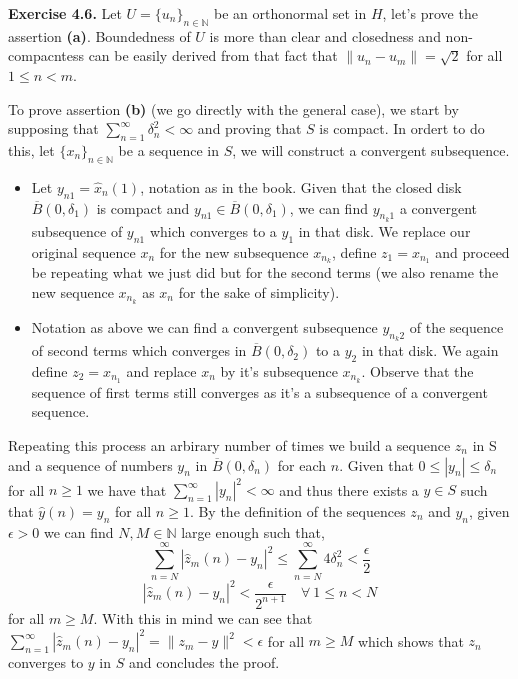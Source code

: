 \documentclass{article}
\begin{document}
\begin{exercise}\textbf{Exercise 4.6.}
    Let $U = \{u_n\}_{n \in \mathbb{N}}$ be an orthonormal set in $H$, let's prove the assertion \textbf{(a)}. Boundedness of $U$ is more than clear and closedness and non-compacntess can be easily derived from that fact that $\|u_n - u_m\| = \sqrt{2}$ for all $1 \le  n < m$. 

\bigbreak

To prove assertion \textbf{(b)} (we go directly with the general case), we start by supposing that $\sum_{n=1}^{\infty} \delta_n^2 < \infty$ and proving that $S$ is compact. In ordert to do this, let $\{x_n\}_{n \in \mathbb{N}}$ be a sequence in $S$, we will construct a convergent subsequence.
\begin{itemize}
    \item Let $y_{n1} = \hat{x}_n \left( 1 \right)$, notation as in the book. Given that the closed disk $\overline{B} \left( 0,\delta_1 \right)$ is compact and $y_{n1} \in \overline{B} \left( 0, \delta_1 \right) $, we can find $y_{n_k1}$ a convergent subsequence of $y_{n1}$ which converges to a $y_1$ in that disk. We replace our original sequence $x_n$ for the new subsequence $x_{n_k}$, define $z_1 = x_{n_1}$  and proceed be repeating what we just did but for the second terms (we also rename the new sequence $x_{n_k}$ as $x_n$ for the sake of simplicity).
    \item Notation as above we can find a convergent subsequence $y_{n_k2}$ of the sequence of second terms which converges in $\overline{B} \left( 0,\delta_2 \right) $ to a $y_2$ in that disk. We again define $z_2 = x_{n_1}$ and replace $x_n$ by it's subsequence $x_{n_k}$. Observe that the sequence of first terms still converges as it's a subsequence of a convergent sequence.  
\end{itemize}
Repeating this process an arbirary number of times we build a sequence $z_n$ in S and a sequence of numbers $y_n$ in $\overline{B} \left( 0,\delta_n \right) $ for each $n$. Given that $0 \le |y_n| \le \delta_n$ for all $n \ge 1$ we have that $\sum_{n=1}^{\infty} |y_n|^2 < \infty $ and thus there exists a $y \in S$ such that $\hat{y} \left( n \right) = y_n$ for all $n \ge 1$. By the definition of the sequences $z_n$ and $y_n$, given $\epsilon > 0$ we can find $N, M \in \mathbb{N}$ large enough such that,
\begin{equation}
    \sum_{n=N}^{\infty} |\hat{z}_m \left( n \right)  - y_n|^2 \le \sum_{n=N}^{\infty} 4\delta_n^2   < \frac{\epsilon}{2}
\end{equation}
\begin{equation}
    |\hat{z}_m \left( n \right)  - y_n|^2 < \frac{\epsilon}{2^{n+1}} \quad \forall\ 1 \le n < N
\end{equation}
for all $m \ge M$. With this in mind we can see that $\sum_{n=1}^{\infty} |\hat{z}_m \left( n \right) - y_n|^2 =  \|z_m-y\|^2 < \epsilon$ for all $m \ge M$ which shows that $z_n$ converges to $y$ in $S$ and concludes the proof. 


\end{exercise}
\end{document}
